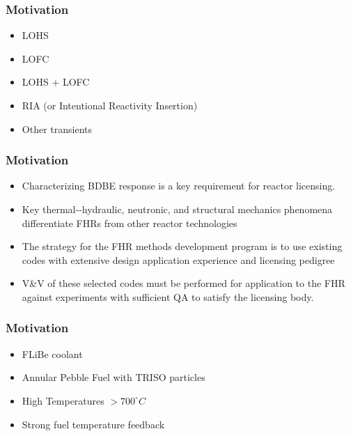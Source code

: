 

\begin{frame}[fragile]
  \frametitle{Motivation}
  \begin{itemize}
    \item LOHS
    \item LOFC
    \item LOHS + LOFC
    \item RIA (or Intentional Reactivity Insertion)
    \item Other transients
  \end{itemize}

\end{frame}

\begin{frame}[fragile]
  \frametitle{Motivation}
    \begin{itemize}
      \item Characterizing BDBE response is a key requirement for reactor
        licensing.
      \item Key thermal-­‐hydraulic, neutronic, and structural mechanics 
        phenomena differentiate FHRs from other reactor technologies 
      \item The strategy for the FHR methods development program is to use 
        existing codes with extensive design application experience and 
        licensing pedigree 
      \item V\&V of these selected codes must be performed for application to 
        the FHR against experiments with sufficient QA to satisfy the licensing 
        body.  
    \end{itemize}
\end{frame}


\begin{frame}[fragile]
  \frametitle{Motivation}
  \begin{itemize}
    \item FLiBe coolant
    \item Annular Pebble Fuel with TRISO particles
    \item High Temperatures $>700^{\circ}C$
    \item Strong fuel temperature feedback 
  \end{itemize}

\end{frame}


